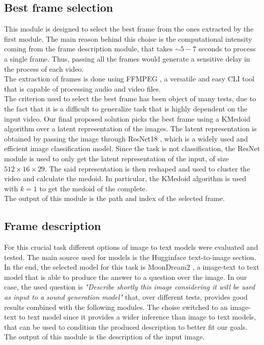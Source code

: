 \documentclass[conference]{IEEEtran}
\begin{document}
\subsection{Best frame selection}
This module is designed to select the best frame from the ones extracted by the first module. The main reason behind this choise is the computational intensity coming from the frame description module,
that takes $\sim 5-7$ seconds to process a single frame. Thus, passing all the frames would generate a sensitive delay in the process of each video. \\ The extraction of frames is done using FFMPEG \cite{ffmpeg}, a versatile and easy CLI tool that is capable of processing audio and video files. \\
The criterion used to select the best frame has been object of many tests, due to the fact that it is a difficult to generalize task that is highly dependent on the input video. 
Our final proposed solution picks the best frame using a KMedoid algorithm over a latent representation of the images. The latent representation is obtained by passing the image through ResNet18 \cite{resnet}, which is a widely used and efficient image classification model. Since the task is not classification, the ResNet module is used to only get the latent representation of the input, of size $512 \times 16 \times 29 $. The said representation is then reshaped and used to cluster the video and calculate the medoid. In particular, the KMedoid algorithm is used with $k=1$ to get the medoid of the complete. \\
The output of this module is the path and index of the selected frame.  

\subsection{Frame description}
For this crucial task different options of image to text models were evaluated and tested. The main source used for models is the Hugginface text-to-image section\cite{hfaceItt}.  
In the end, the selected model for this task is MoonDream2 \cite{moondream2}, a image-text to text model that is able to produce the answer to a question over the image.
In our case, the used question is \emph{"Describe shortly this image considering it will be used as input to a sound generation model"} that, over different tests, provides good results combined with the following modules.
The choise switched to an image-text to text model since it provides a wider inference than image to text models, that can be used to condition the produced description to better fit our goals.\\
The output of this module is the description of the input image.
\end{document}
